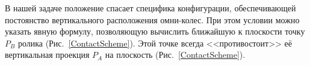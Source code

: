 В нашей задаче положение спасает специфика конфигурации, обеспечивающей 
постоянство вертикального расположения омни-колес. При этом условии можно
указать явную формулу, позволяющую вычислить ближайшую к плоскости точку $P_B$
ролика (Рис.~\ref{ContactScheme}). Этой точке всегда <<противостоит>> её 
вертикальная проекция $P_A$ на плоскость (Рис.~\ref{ContactScheme}).

\begin{figure}[htb]
    \hspace{45pt}
\end{figure}

